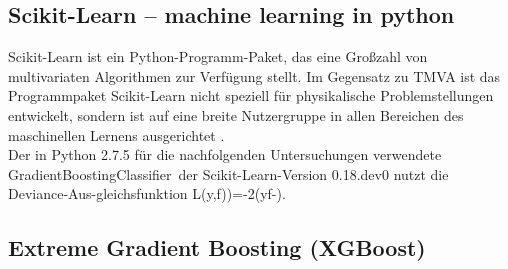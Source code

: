 \subsection{Scikit-Learn -- machine learning in python}
\label{ch:Algorithmen:subsec:sklearn}

Scikit-Learn ist ein Python-Programm-Paket, das eine Gro\ss zahl von multivariaten Algorithmen zur Verf\"ugung stellt. Im Gegensatz zu TMVA ist das Programmpaket Scikit-Learn nicht speziell f\"ur physikalische Problemstellungen entwickelt, sondern ist auf eine breite Nutzergruppe in allen Bereichen des maschinellen Lernens ausgerichtet \cite{DBLP:journals/corr/abs-1201-0490}.\\
Der in Python 2.7.5 f\"ur die nachfolgenden Untersuchungen verwendete \glqq GradientBoostingClassifier\grqq~der Scikit-Learn-Version 0.18.dev0 nutzt die \glqq Deviance\grqq-Aus-gleichsfunktion
\beq
L\left(y,f)\right)=-2\left(y\cdot f-\right).
\label{eq:deviance}
\eeq

\subsection{Extreme Gradient Boosting (XGBoost)}
\label{ch:Algorithmen:subsec:XGB}

